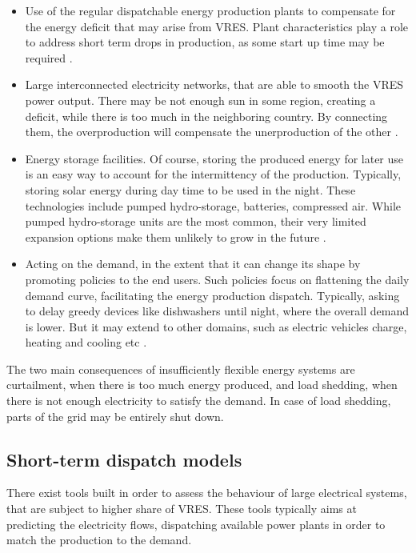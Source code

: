 \begin{itemize}
    \item Use of the regular dispatchable energy production plants to compensate for the energy deficit that may arise from VRES. Plant characteristics play a role to address short term drops in production, as some start up time may be required \cite{flexibility-storage-planning}.
    \item Large interconnected electricity networks, that are able to smooth the VRES power output. There may be not enough sun in some region, creating a deficit, while there is too much in the neighboring country. By connecting them, the overproduction will compensate the unerproduction of the other \cite{flexibility-connection}.
    \item Energy storage facilities. Of course, storing the produced energy for later use is an easy way to account for the intermittency of the production. Typically, storing solar energy during day time to be used in the night. These technologies include pumped hydro-storage, batteries, compressed air. While pumped hydro-storage units are the most common, their very limited expansion options make them unlikely to grow in the future \cite{flexibility-demdandside-forecasts-storage}.
    \item Acting on the demand, in the extent that it can change its shape by promoting policies to the end users. Such policies focus on flattening the daily demand curve, facilitating the energy production dispatch. Typically, asking to delay greedy devices like dishwashers until night, where the overall demand is lower. But it may extend to other domains, such as electric vehicles charge, heating and cooling etc \cite{flexibility-demdandside-forecasts-storage}.
\end{itemize}

The two main consequences of insufficiently flexible energy systems are curtailment, when there is too much energy produced, and load shedding, when there is not enough electricity to satisfy the demand. In case of load shedding, parts of the grid may be entirely shut down.

\subsection{Short-term dispatch models}

There exist tools built in order to assess the behaviour of large electrical systems, that are subject to higher share of VRES. These tools typically aims at predicting the electricity flows, dispatching available power plants in order to match the production to the demand. 

